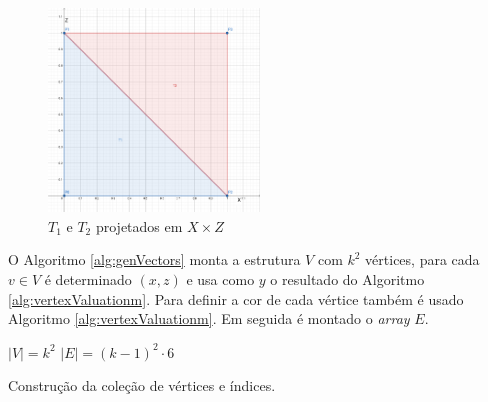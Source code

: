 \begin{figure}[H]
    \centering
    \includegraphics[width=0.5\textwidth]{figuras/t1t2.png}
    \caption{$T_{1}$ e $T_{2}$ projetados em $X \times Z$}
    \label{fig:t1t2}
\end{figure}

O Algoritmo \ref{alg:genVectors} monta a estrutura $V$ com $k^2$ vértices, para cada $v \in V$
é determinado $(x, z)$ e usa como $y$ o resultado do Algoritmo \ref{alg:vertexValuationm}. 
Para definir a cor de cada vértice também é usado Algoritmo \ref{alg:vertexValuationm}. Em seguida é montado o
\textit{array} $E$.
 
\begin{algorithm}[H]\label{alg:genVectors}
    $|V| = k^2$\;
    $|E| = (k-1)^2 \cdot 6$\;
    \caption{Construção da coleção de vértices e índices.}
\end{algorithm}


